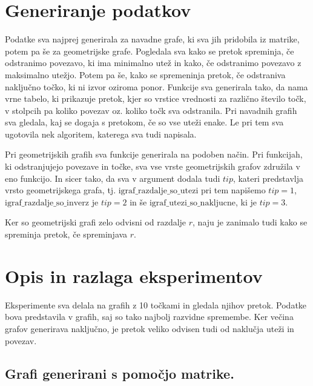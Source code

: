 \documentclass[a4paper]{article}
\begin{document}
\section{Generiranje podatkov}
Podatke sva najprej generirala za navadne grafe, ki sva jih pridobila iz matrike, potem pa še za geometrijske grafe. Pogledala sva kako se pretok spreminja, če odstranimo povezavo, ki ima minimalno utež in kako, če odstranimo povezavo z maksimalno utežjo. Potem pa še, kako se spremeninja pretok, če odstraniva naključno točko, ki ni izvor oziroma ponor. Funkcije sva generirala tako, da nama vrne tabelo, ki prikazuje pretok, kjer so  vrstice vrednosti za različno število točk, v stolpcih pa koliko povezav oz. koliko točk sva odstranila. Pri navadnih grafih sva gledala, kaj se dogaja s pretokom, če so vse uteži enake. Le pri tem sva ugotovila nek algoritem, katerega sva tudi napisala. 

Pri geometrijskih grafih sva funkcije generirala na podoben način. Pri funkcijah, ki odstranjujejo povezave in točke, sva vse vrste geometrijskih grafov združila v eno funkcijo. In sicer tako, da sva v argument dodala tudi $tip$, kateri predstavlja vrsto geometrijskega grafa, tj. $\text{igraf\_razdalje\_so\_utezi}$ pri tem napišemo $tip = 1$, $\text{igraf\_razdalje\_so\_inverz}$ je $tip = 2$ in še $\text{igraf\_utezi\_so\_nakljucne}$, ki je $tip = 3.$

Ker so geometrijski grafi zelo odvisni od razdalje $r$, naju je zanimalo tudi kako se spreminja pretok, če spreminjava $r$. 

\section{Opis in razlaga eksperimentov}

Eksperimente sva delala na grafih z 10 točkami in gledala njihov pretok. Podatke bova predstavila v grafih, saj so tako najbolj razvidne spremembe. Ker večina grafov generirava naključno, je pretok veliko odvisen tudi od naklučja uteži in povezav. 

\pagebreak
\subsection{Grafi generirani s pomočjo matrike.}
\end{document}
